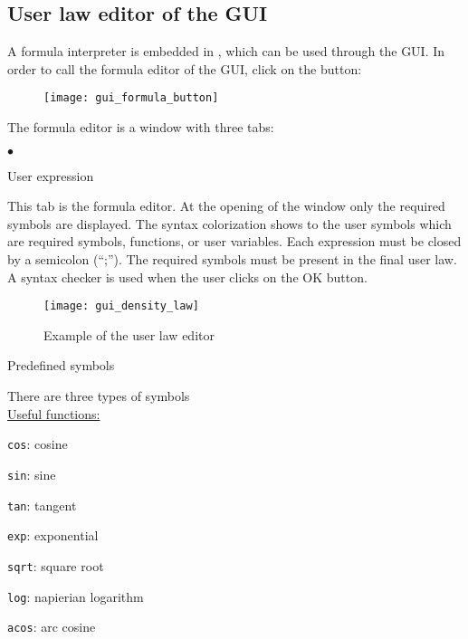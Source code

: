 {{{%
\subsection{User law editor of the GUI}

A formula interpreter is embedded in \CS, which can be used through the GUI.
In order to call the formula editor of the GUI, click on the button:

\begin{figure}[!ht]
\begin{center}
\texttt{[image: gui\_formula\_button]}
\label{fig:mei_button}
\end{center}
\end{figure}

The formula editor is a window with three tabs:
\begin{list}{$\bullet$}{}
\item User expression

This tab is the formula editor. At the opening of the
window only the required symbols are displayed.
The syntax colorization shows to the user symbols which are
required symbols, functions, or user variables.
Each expression must be closed by a semicolon (``;''). The
required symbols must be present in the final user law. A
syntax checker is used when the user clicks on the OK button.

\begin{figure}[!ht]
\begin{center}
\texttt{[image: gui\_density\_law]}
\caption{Example of the user law editor}
\label{fig:mei_editor}
\end{center}
\end{figure}

\item Predefined symbols

There are three types of symbols \\

\underline{Useful functions:}

\texttt{cos}: cosine

\texttt{sin}: sine

\texttt{tan}: tangent

\texttt{exp}: exponential

\texttt{sqrt}: square root

\texttt{log}: napierian logarithm

\texttt{acos}: arc cosine


\end{list}}}}
